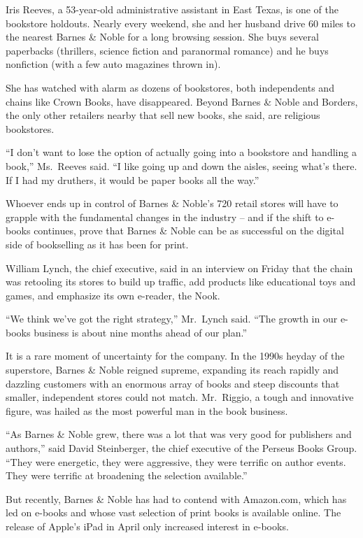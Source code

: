 ﻿\documentclass[12pt]{article}
\begin{document}
Iris Reeves, a 53-year-old administrative assistant in East Texas, is one of the bookstore holdouts.
Nearly every weekend, she and her husband drive 60 miles to the nearest Barnes \& Noble for a long
browsing session. She buys several paperbacks (thrillers, science fiction and paranormal romance)
and he buys nonfiction (with a few auto magazines thrown in).

She has watched with alarm as dozens of bookstores, both independents and chains like Crown Books,
have disappeared. Beyond Barnes \& Noble and Borders, the only other retailers nearby that sell new
books, she said, are religious bookstores.

``I don't want to lose the option of actually going into a bookstore and handling a book,''
Ms.~Reeves said. ``I like going up and down the aisles, seeing what's there. If I had my druthers,
it would be paper books all the way.''

Whoever ends up in control of Barnes \& Noble's 720 retail stores will have to grapple with the
fundamental changes in the industry -- and if the shift to e-books continues, prove that Barnes \&
Noble can be as successful on the digital side of bookselling as it has been for print.

William Lynch, the chief executive, said in an interview on Friday that the chain was retooling its
stores to build up traffic, add products like educational toys and games, and emphasize its own
e-reader, the Nook.

``We think we've got the right strategy,'' Mr.~Lynch said. ``The growth in our e-books business is
about nine months ahead of our plan.''

It is a rare moment of uncertainty for the company. In the 1990s heyday of the superstore, Barnes \&
Noble reigned supreme, expanding its reach rapidly and dazzling customers with an enormous array of
books and steep discounts that smaller, independent stores could not match. Mr.~Riggio, a tough and
innovative figure, was hailed as the most powerful man in the book business.

``As Barnes \& Noble grew, there was a lot that was very good for publishers and authors,'' said
David Steinberger, the chief executive of the Perseus Books Group. ``They were energetic, they were
aggressive, they were terrific on author events. They were terrific at broadening the selection
available.''

But recently, Barnes \& Noble has had to contend with Amazon.com, which has led on e-books and whose
vast selection of print books is available online. The release of Apple's iPad in April only
increased interest in e-books.
\end{document}
